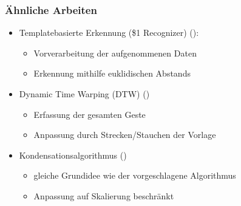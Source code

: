 \documentclass{beamer}
\begin{document}
\begin{frame}\frametitle{Ähnliche Arbeiten}
\begin{itemize}
\item Templatebasierte Erkennung (\$1 Recognizer) (\citet{Wobbrock2007}):
\begin{itemize}
\item Vorverarbeitung der aufgenommenen Daten
\item Erkennung mithilfe euklidischen Abstands
\end{itemize}
\item Dynamic Time Warping (DTW) (\citet{Gawrila1995,Liu2009})
\begin{itemize}
\item Erfassung der gesamten Geste
\item Anpassung durch Strecken/Stauchen der Vorlage
\end{itemize}
\item Kondensationsalgorithmus (\citet{BlackandJepson1998a})
\begin{itemize}
\item gleiche Grundidee wie der vorgeschlagene Algorithmus
\item Anpassung auf Skalierung beschränkt
\end{itemize}
\end{itemize}
\end{frame}
\end{document}
